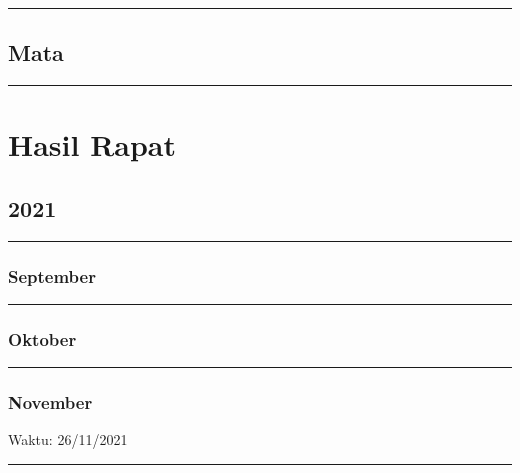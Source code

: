 \documentclass[
]{book}
\begin{document}
\begin{center}\rule{0.5\linewidth}{0.5pt}\end{center}

\hypertarget{mata-1}{%
\section{Mata}\label{mata-1}}

\begin{center}\rule{0.5\linewidth}{0.5pt}\end{center}

\hypertarget{hasil-rapat}{%
\chapter{Hasil Rapat}\label{hasil-rapat}}

\hypertarget{section}{%
\section{2021}\label{section}}

\begin{center}\rule{0.5\linewidth}{0.5pt}\end{center}

\hypertarget{september}{%
\subsection{September}\label{september}}

\begin{center}\rule{0.5\linewidth}{0.5pt}\end{center}

\hypertarget{oktober}{%
\subsection{Oktober}\label{oktober}}

\begin{center}\rule{0.5\linewidth}{0.5pt}\end{center}

\hypertarget{november}{%
\subsection{November}\label{november}}

Waktu: 26/11/2021

\begin{center}\rule{0.5\linewidth}{0.5pt}\end{center}
\end{document}
